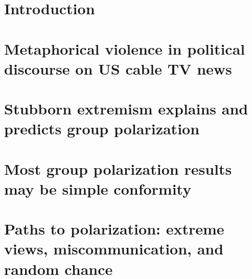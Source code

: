 \documentclass[12pt,chapterheads]{UCMerced}
\begin{document}

%   
%   
\chapter{Introduction}



\chapter{Metaphorical violence in political discourse on US cable TV news}



\chapter{Stubborn extremism explains and predicts group polarization}



\chapter{Most group polarization results may be simple conformity}




\chapter{Paths to polarization: extreme views, miscommunication, and random chance}









\end{document}
